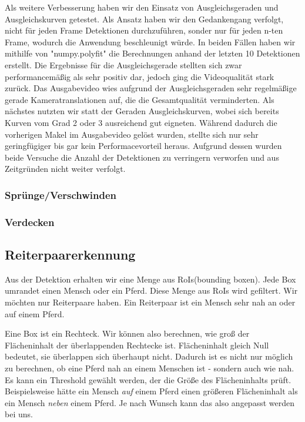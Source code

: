 Als weitere Verbesserung haben wir den Einsatz von Ausgleichsgeraden und Ausgleichskurven getestet. Als Ansatz haben wir den Gedankengang verfolgt, nicht für jeden Frame Detektionen durchzuführen, sonder nur für jeden n-ten Frame, wodurch die Anwendung beschleunigt würde. 
In beiden Fällen haben wir mithilfe von "numpy.polyfit" die Berechnungen anhand der letzten 10 Detektionen erstellt. Die Ergebnisse für die Ausgleichsgerade stellten sich zwar performancemäßig als sehr positiv dar, jedoch ging die Videoqualität stark zurück. Das Ausgabevideo wies aufgrund der Ausgleichsgeraden sehr regelmäßige gerade Kameratranslationen auf, die die Gesamtqualität verminderten.
Als nächstes nutzten wir statt der Geraden Ausgleichskurven, wobei sich bereits Kurven vom Grad 2 oder 3 ausreichend gut eigneten. Während dadurch die vorherigen Makel im Ausgabevideo gelöst wurden, stellte sich nur sehr geringfügiger bis gar kein Performacevorteil heraus. Aufgrund dessen wurden beide Versuche die Anzahl der Detektionen zu verringern verworfen und aus Zeitgründen nicht weiter verfolgt.




\subsubsection*{Sprünge/Verschwinden}
\subsubsection*{Verdecken}

\subsection*{Reiterpaarerkennung}
Aus der Detektion erhalten wir eine Menge aus RoIs(bounding boxen).
Jede Box umrandet einen Mensch oder ein Pferd. Diese Menge aus RoIs wird gefiltert. Wir möchten nur Reiterpaare haben. Ein Reiterpaar ist ein Mensch sehr nah an oder auf einem Pferd.

Eine Box ist ein Rechteck. Wir können also berechnen, wie groß der Flächeninhalt der überlappenden Rechtecke ist. Flächeninhalt gleich Null bedeutet, sie überlappen sich überhaupt nicht.
Dadurch ist es nicht nur möglich zu berechnen, ob eine Pferd nah an einem Menschen ist - sondern auch wie nah. Es kann ein Threshold gewählt werden, der die Größe des Flächeninhalts prüft. Beispielsweise hätte ein Mensch \emph{auf} einem Pferd einen größeren Flächeninhalt als ein Mensch \emph{neben} einem Pferd. Je nach Wunsch kann das also angepasst werden bei uns.


